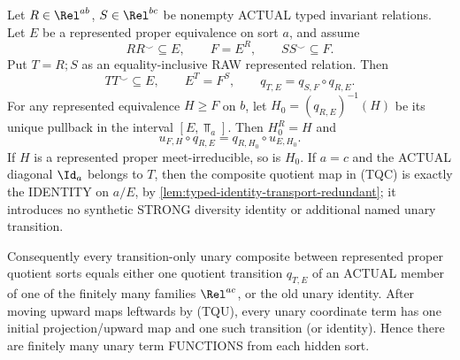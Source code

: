 \begin{lemma}
\label{lem:typed-transition-composition-normal-form}
Let \(R\in\Rel^{ab}\),
\(S\in\Rel^{bc}\) be
nonempty ACTUAL typed
invariant relations.
Let \(E\) be a represented
proper equivalence on
sort \(a\), and assume
\[
 RR^\smile\subseteq E,\qquad
 F=E^R,\qquad
 SS^\smile\subseteq F .
\]
Put \(T=R;S\) as an
equality-inclusive RAW
represented relation.
Then
\[
 TT^\smile\subseteq E,\qquad
 E^T=F^S,\qquad
 q_{T,E}=q_{S,F}\circ q_{R,E}.
\tag{TQC}\label{eq:typed-transition-composition}
\]
For any represented
equivalence \(H\ge F\)
on \(b\), let
\(H_0=(q_{R,E})^{-1}(H)\)
be its unique pullback
in the interval
\([E,\Top_a]\). Then
\(H_0^R=H\) and
\[
 u_{F,H}\circ q_{R,E}
 =q_{R,H_0}\circ u_{E,H_0}.
\tag{TQU}\label{eq:typed-upward-interchange}
\]
If \(H\) is a represented
proper meet-irreducible,
so is \(H_0\). If
\(a=c\) and the ACTUAL
diagonal \(\Id_a\)
belongs to \(T\), then
the composite quotient
map in (TQC) is exactly
the IDENTITY on \(a/E\),
by \cref{lem:typed-identity-transport-redundant};
it introduces no synthetic
STRONG diversity identity
or additional named unary
transition.

Consequently every
transition-only unary
composite between
represented proper
quotient sorts equals
either one quotient
transition \(q_{T,E}\)
of an ACTUAL member of
one of the finitely many
families \(\Rel^{ac}\),
or the old unary identity.
After moving upward maps
leftwards by (TQU),
every unary coordinate
term has one initial
projection/upward map
and one such transition
(or identity). Hence
there are finitely many
unary term FUNCTIONS
from each hidden sort.
\end{lemma}

